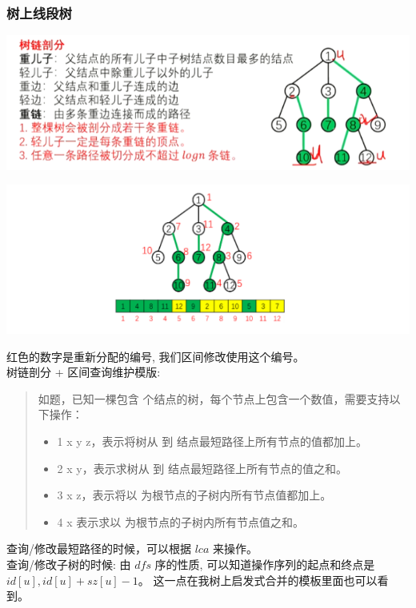 \documentclass[a4paper,12pt]{article}
\begin{document}
\subsubsection{树上线段树}

\includegraphics[scale=0.8]{线段树1.png}

\includegraphics[scale=0.8]{线段树2.png}

\noindent 红色的数字是重新分配的编号, 我们区间修改使用这个编号。
\\

\noindent 树链剖分 + 区间查询维护模版:

\begin{quote}
如题，已知一棵包含 个结点的树，每个节点上包含一个数值，需要支持以下操作：
\begin{itemize}
    \item 1 x y z，表示将树从 到 结点最短路径上所有节点的值都加上。
    \item 2 x y，表示求树从 到 结点最短路径上所有节点的值之和。
    \item 3 x z，表示将以 为根节点的子树内所有节点值都加上。
    \item 4 x 表示求以 为根节点的子树内所有节点值之和。
\end{itemize}    
\end{quote}

\noindent 查询/修改最短路径的时候，可以根据 \(lca\) 来操作。
\\

\noindent 查询/修改子树的时候: 由 \(dfs\) 序的性质, 可以知道操作序列的起点和终点是 \(id[u],id[u]+sz[u]-1\)。
这一点在我树上启发式合并的模板里面也可以看到。
\end{document}
